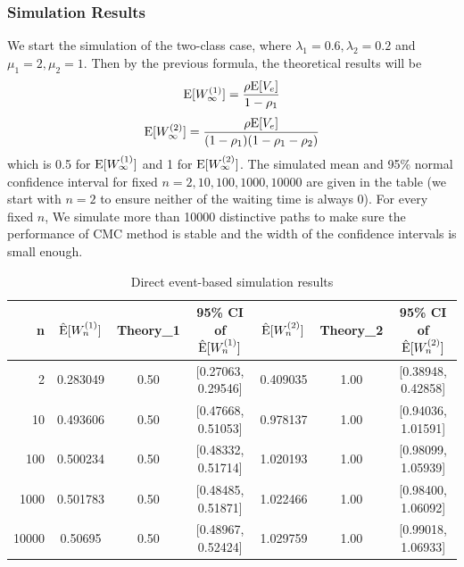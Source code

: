 \documentclass{article}
\begin{document}
\subsubsection{Simulation Results}
We start the simulation of the two-class case, where $\lambda_1 = 0.6,\lambda_2 = 0.2$ and $\mu_1 = 2, \mu_2 = 1$. 
Then by the previous formula, the theoretical results will be 
\begin{equation}
	{\rm E}[W_{\infty}^{(1)}]=\frac{\rho {\rm E}[V_e] }{1-\rho_1}
\end{equation}
\begin{equation}
	{\rm E}[W_{\infty}^{(2)}]=\frac{\rho {\rm E}[V_e] }{(1-\rho_1)(1-\rho_1-\rho_2)}
\end{equation}
which is 0.5 for ${\rm E}[W_{\infty}^{(1)}]$ and 1 for ${\rm E}[W_{\infty}^{(2)}]$.
The simulated mean and 95\% normal confidence interval for fixed $n=2, 10, 100, 1000, 10000$ are given in the table (we start with $n=2$ to ensure neither of the waiting time is always 0).
For every fixed $n$, We simulate more than 10000 distinctive paths to make sure the performance of CMC method is stable and the width of the confidence intervals is small enough.

\begin{table}[!htbp]
    \small
	\centering
	\begin{tabularx}{0.85\textwidth}{rcccccc}
		\toprule
        n
		& $\hat{{\rm E}}[W_n^{(1)}]$ 
		& Theory\_1
        & 95\% CI of $\hat{{\rm E}}[W_n^{(1)}]$
		& $\hat{{\rm E}}[W_n^{(2)}]$ 
		& Theory\_2
		& 95\% CI of $\hat{{\rm E}}[W_n^{(2)}]$
		\\

        \midrule
        2
        & 0.283049
		& 0.50
        & [0.27063, 0.29546]
		& 0.409035
		& 1.00
		& [0.38948, 0.42858]

        \\
        \midrule
        10
        & 0.493606
		& 0.50
        & [0.47668, 0.51053]
		& 0.978137
		& 1.00
		& [0.94036, 1.01591]

        \\
        \midrule
        100
        & 0.500234
		& 0.50
        & [0.48332, 0.51714]
		& 1.020193
		& 1.00
		& [0.98099, 1.05939]
        \\
        \midrule
        1000
        & 0.501783
		& 0.50
        & [0.48485, 0.51871]
		& 1.022466
		& 1.00
		& [0.98400, 1.06092]
		\\
        \midrule
        10000
        & 0.50695
		& 0.50
        & [0.48967, 0.52424]
		& 1.029759
		& 1.00
		& [0.99018, 1.06933]
        \\
		\bottomrule
	\end{tabularx}%
	\label{tab:tab7}%
	\caption{Direct event-based simulation results}
\end{table}%
\end{document}
